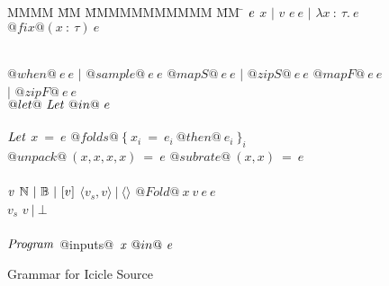 
\begin{figure}

\begin{tabbing}
MMMM \= MM \= MMMMMMMMMMM \= MM \= \kill
$\mathit{e}$
\GrammarDef $x$
\> $|$ \> $v$
\GrammarAlt $e~e$
\> $|$ \> $\lambda{}x~:~\tau.~e$
\GrammarAlt $@fix@ (x~:~\tau)~e$

\\
\GrammarAlt $@when@~e~e$
\> $|$ \> $@sample@~e~e$
\GrammarAlt $@mapS@~e~e$
\> $|$ \> $@zipS@~e~e$
\GrammarAlt $@mapF@~e~e$
\> $|$ \> $@zipF@~e~e$
\\
\GrammarAlt $@let@~\mathit{Let}~@in@~e$
\\
\\

$\mathit{Let}$
\GrammarDef $x~=~e$
\GrammarAlt $@folds@~\{~x_i~=~e_i~@then@~e_i~\}_i$
\GrammarAlt $@unpack@~(x,x,x,x)~=~e$
\GrammarAlt $@subrate@~(x,x)~=~e$
\\
\\

$\mathit{v}$
\GrammarDef $\mathbb{N} ~|~ \mathbb{B} ~|~ [v]$
\GrammarAlt $\langle v_s, v \rangle ~|~ \langle\rangle$
\GrammarAlt $@Fold@~x~v~e~e$
\\

$v_s$
\GrammarDef $v ~|~ \bot$
\\
\\


$\mathit{Program}$
\GrammarDef @inputs@~$\mathit{x}~@in@~\mathit{e}$ \\
\end{tabbing}

\caption{Grammar for Icicle Source}
\label{fig:source:grammar}
\end{figure}

